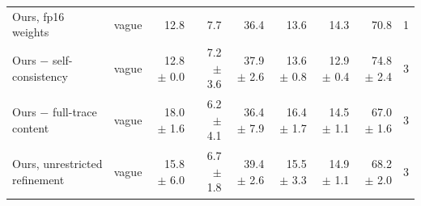 \begin{table}[t]
\begin{tabular}{llrrrrrrr}
Ours, fp16 weights & vague & 12.8 & 7.7 & 36.4 & 13.6 & 14.3 & 70.8 & 1 \\
Ours − self-consistency & vague & 12.8 $\pm$ 0.0 & 7.2 $\pm$ 3.6 & 37.9 $\pm$ 2.6 & 13.6 $\pm$ 0.8 & 12.9 $\pm$ 0.4 & 74.8 $\pm$ 2.4 & 3 \\
Ours − full-trace content & vague & 18.0 $\pm$ 1.6 & 6.2 $\pm$ 4.1 & 36.4 $\pm$ 7.9 & 16.4 $\pm$ 1.7 & 14.5 $\pm$ 1.1 & 67.0 $\pm$ 1.6 & 3 \\
Ours, unrestricted refinement & vague & 15.8 $\pm$ 6.0 & 6.7 $\pm$ 1.8 & 39.4 $\pm$ 2.6 & 15.5 $\pm$ 3.3 & 14.9 $\pm$ 1.1 & 68.2 $\pm$ 2.0 & 3 \\
\bottomrule
\end{tabular}
\label{tab:main}
\end{table}
